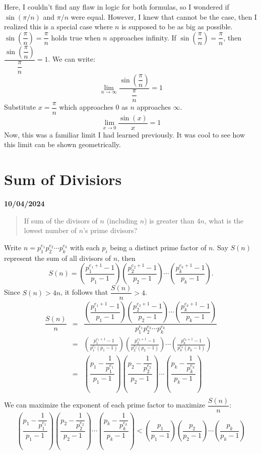 \documentclass[12pt, oneside]{article}
\begin{document}
Here, I couldn't find any flaw in logic for both formulas, so I wondered if $\sin(\pi/n)$ and $\pi/n$ were equal. However, I knew that cannot be the case, then I realized this is a special case where $n$ is supposed to be as big as possible. $\sin\left(\dfrac{\pi}{n}\right) = \dfrac{\pi}{n}$ holds true when $n$ approaches infinity. If $\sin\left(\dfrac{\pi}{n}\right) = \dfrac{\pi}{n}$, then $\dfrac{\sin\left(\dfrac{\pi}{n}\right)}{\dfrac{\pi}{n}} = 1$. We can write:
\[\lim_{n\rightarrow\infty} \dfrac{\sin\left(\dfrac{\pi}{n}\right)}{\dfrac{\pi}{n}} = 1\] 
Substitute $x = \dfrac{\pi}{n}$ which approaches 0 as $n$ approaches $\infty$.\\
\[\lim_{x\rightarrow0} \dfrac{\sin(x)}{x} = 1\]
Now, this was a familiar limit I had learned previously. It was cool to see how this limit can be shown geometrically.
\section*{Sum of Divisiors}
\textbf{10/04/2024}\\
\begin{quote}If sum of the divisors of $n$ (including $n$) is greater than $4n$, what is the lowest number of $n$'s prime divisors?\end{quote}
Write $n = p_1^{e_1}p_2^{e_2} \cdots p_k^{e_k}$ with each $p_i$ being a distinct prime factor of $n$. Say $S(n)$ represent the sum of all divisors of $n$, then \[S(n) = \left(\frac{p_1^{e_1+1}-1}{p_1-1}\right)\left(\frac{p_2^{e_2+1}-1}{p_2-1}\right)\cdots\left(\frac{p_k^{e_k+1}-1}{p_k-1}\right).\] Since $S(n) > 4n$, it follows that $\dfrac{S(n)}{n} > 4$.
\begin{eqnarray*}
\dfrac{S(n)}{n} & = & \dfrac{\left(\dfrac{p_1^{e_1+1}-1}{p_1-1}\right)\left(\dfrac{p_2^{e_2+1}-1}{p_2-1}\right)\cdots\left(\dfrac{p_k^{e_k+1}-1}{p_k-1}\right)}{p_1^{e_1}p_2^{e_2} \cdots p_k^{e_k}}\\
& = & \left(\frac{p_1^{e_1+1}-1}{p_1^{e_1}(p_1-1)}\right)\left(\frac{p_2^{e_2+1}-1}{p_2^{e_2}(p_2-1)}\right)\cdots\left(\frac{p_k^{e_k+1}-1}{p_k^{e_k}(p_k-1)}\right)\\
& = & \left(\dfrac{p_1-\dfrac{1}{p_1^{e_1}}}{p_1-1}\right)\left(\dfrac{p_2-\dfrac{1}{p_2^{e_2}}}{p_2-1}\right)\cdots\left(\dfrac{p_k-\dfrac{1}{p_k^{e_k}}}{p_k-1}\right)\\
\end{eqnarray*}
We can maximize the exponent of each prime factor to maximize $\dfrac{S(n)}{n}$:
\[
\left(\dfrac{p_1-\dfrac{1}{p_1^{e_1}}}{p_1-1}\right)\left(\dfrac{p_2-\dfrac{1}{p_2^{e_2}}}{p_2-1}\right)\cdots\left(\dfrac{p_k-\dfrac{1}{p_k^{e_k}}}{p_k-1}\right) < \left(\dfrac{p_1}{p_1-1}\right)\left(\dfrac{p_2}{p_2-1}\right)\cdots\left(\dfrac{p_k}{p_k-1}\right)
\]
\end{document}

